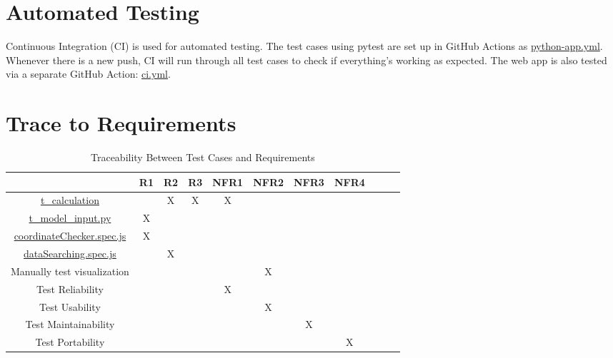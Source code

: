 \documentclass[12pt, titlepage]{article}
\begin{document}
\section{Automated Testing}
Continuous Integration (CI) is used for automated testing. The test cases using pytest are set up in GitHub Actions as \href{https://github.com/smiths/BridgeChlorideExposurePredictor/blob/main/.github/workflows/python-app.yml}{python-app.yml}. Whenever there is a new push, CI will run through all test cases to check if everything's working as expected.  The web app is also tested via a separate GitHub Action: \href{https://github.com/smiths/BridgeChlorideExposurePredictor/blob/main/.github/workflows/ci.yml}{ci.yml}.

\section{Trace to Requirements}

\begin{table}[h]
\centering
\begin{tabular}{|c|c|c|c|c|c|c|c|c|c|c|}
\hline
	& R1 & R2 & R3  & NFR1 & NFR2 & NFR3 & NFR4  \\
\hline
\href{https://github.com/smiths/BridgeChlorideExposurePredictor/blob/main/src/database/test_calculation.py}{t\_calculation} & & X & X & X & & &  \\ \hline
\href{https://github.com/smiths/BridgeChlorideExposurePredictor/blob/main/src/database/test_model_input.py}{t\_model\_input.py} & X & & & & & &  \\ \hline
\href{https://github.com/smiths/BridgeChlorideExposurePredictor/blob/main/src/web/tests/unit/coordinateChecker.spec.js}{coordinateChecker.spec.js}        & X & & & & & &  \\ \hline
\href{https://github.com/smiths/BridgeChlorideExposurePredictor/blob/main/src/web/tests/unit/dataSearching.spec.js}{dataSearching.spec.js}  & & X & & & & &  \\ \hline
Manually test visualization & & & & & X & &  \\ \hline
Test Reliability       & & & & X & & &  \\ \hline
Test Usability       & & & & & X & &  \\ \hline
Test Maintainability        & & & & & & X &  \\ \hline
Test Portability        & & & & & & & X  \\ \hline

\end{tabular}
\caption{Traceability Between Test Cases and Requirements}
\label{Table:test_requirements}
\end{table}
\end{document}

